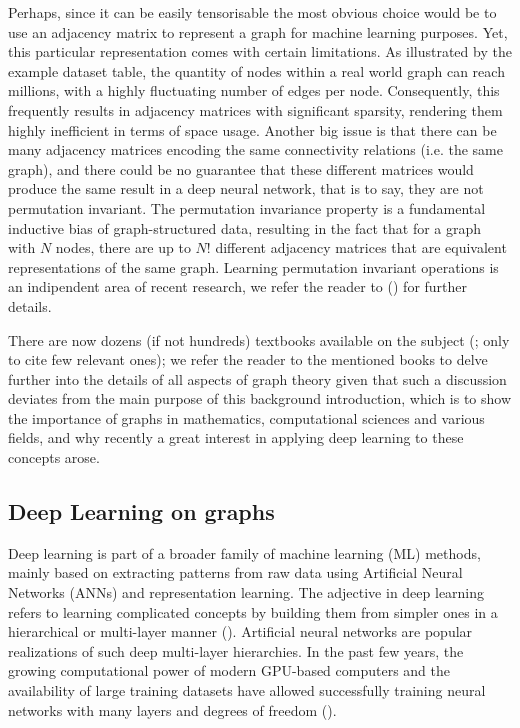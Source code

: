 \documentclass[binding=0.6cm]{sapthesis}
\newcommand{\mycite}[1]{(\cite{#1})}
\begin{document}
Perhaps, since it can be easily tensorisable the most obvious choice would be to use an adjacency matrix to represent a graph for machine learning purposes. Yet, this particular representation comes with certain limitations. As illustrated by the example dataset table, the quantity of nodes within a real world graph can reach millions, with a highly fluctuating number of edges per node. Consequently, this frequently results in adjacency matrices with significant sparsity, rendering them highly inefficient in terms of space usage. Another big issue is that there can be many adjacency matrices encoding the same connectivity relations (i.e. the same graph), and there could be no guarantee that these different matrices would produce the same result in a deep neural network, that is to say, they are not permutation invariant. The permutation invariance property is a fundamental inductive bias of graph-structured data, resulting in the fact that for a graph with $N$ nodes, there are up to $N!$ different adjacency matrices that are equivalent representations of the same graph. Learning permutation invariant operations is an indipendent area of recent research, we refer the reader to \mycite{mena2018learning,murphy2019janossy} for further details.

There are now dozens (if not hundreds) textbooks available on the subject (\cite{griffin2023applied,cormen2022introduction,diestel2017graph,bondy2011graph,berge1976graphs}; only to cite few relevant ones); we refer the reader to the mentioned books to delve further into the details of all aspects of graph theory given that such a discussion deviates from the main purpose of this background introduction, which is to show the importance of graphs in mathematics, computational sciences and various fields, and why recently a great interest in applying deep learning to these concepts arose. 

\subsection{Deep Learning on graphs}
\label{sec:bg.gnn.DL-on-graphs}
Deep learning is part of a broader family of machine learning (ML) methods, mainly based on extracting patterns from raw data using Artificial Neural Networks (ANNs) and representation learning. The adjective  in deep learning refers to learning complicated concepts by building them from simpler ones in a hierarchical or multi-layer manner \mycite{LeCun2015DeepL}. Artificial neural networks are popular realizations of such deep multi-layer hierarchies. In the past few years, the growing computational power of modern GPU-based computers and the availability of large training datasets have allowed successfully training neural networks with many layers and degrees of freedom \mycite{Bronstein_2017}.
\end{document}
